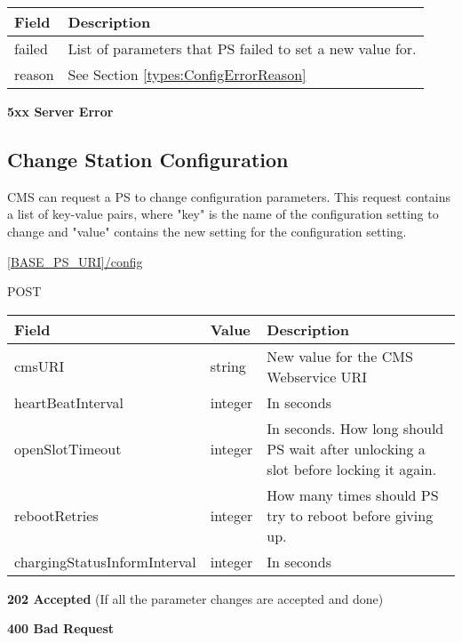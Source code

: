 \begin{tabularx}{\linewidth}{ | l | X | }
  \hline
  \rowcolor{table-head}
  Field & Description \\
  \hline
  failed		& List of parameters that \acs{PS} failed to set a new value for.\\
  reason 	& See Section \ref{types:ConfigErrorReason} \\
  \hline
\end{tabularx}

\textbf{5xx Server Error}

\subsection{Change Station Configuration}
\label{cms:change-conf}

\acs{CMS} can request a \acs{PS} to change configuration parameters. This request contains a list of key-value pairs, where "key" is the name of the configuration setting to change and "value" contains the new setting for the configuration setting.

 \url{[BASE_PS_URI]/config}

 POST

\begin{table}[!h]
\vspace{-7mm}
\begin{tabularx}{\linewidth}{ | l | l | X | }
  \hline
  \rowcolor{table-head}
  Field & Value & Description \\
  \hline
  cmsURI 			& string 		& New value for the \acs{CMS} Webservice URI \\
  heartBeatInterval 			& integer 		& In seconds \\
  openSlotTimeout 			& integer 		& In seconds. How long should \acs{PS} wait after unlocking a slot before locking it again. \\
  rebootRetries 				& integer 		& How many times should \acs{PS} try to reboot before giving up.\\
  chargingStatusInformInterval 	& integer 		& In seconds \\
  \hline
\end{tabularx}
\end{table}

\textbf{202 Accepted} (If all the parameter changes are accepted and done)

 \textbf{400 Bad Request}

